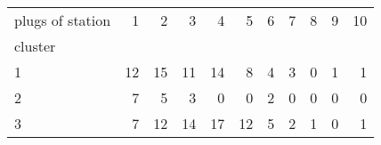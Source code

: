 \begin{tabular}{lrrrrrrrrrr}
\toprule
plugs of station &  1  &  2  &  3  &  4  &  5  &  6  &  7  &  8  &  9  &  10 \\
cluster &     &     &     &     &     &     &     &     &     &     \\
\midrule
1       &  12 &  15 &  11 &  14 &   8 &   4 &   3 &   0 &   1 &   1 \\
2       &   7 &   5 &   3 &   0 &   0 &   2 &   0 &   0 &   0 &   0 \\
3       &   7 &  12 &  14 &  17 &  12 &   5 &   2 &   1 &   0 &   1 \\
\bottomrule
\end{tabular}
